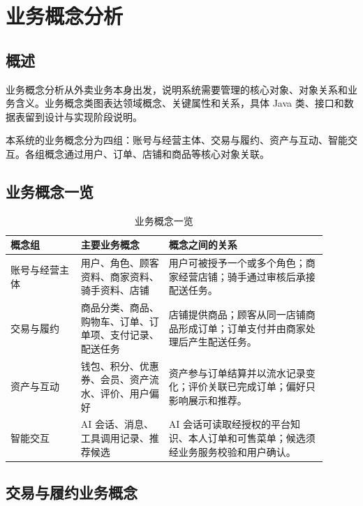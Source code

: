 \section{业务概念分析}

\subsection{概述}

业务概念分析从外卖业务本身出发，说明系统需要管理的核心对象、对象关系和业务含义。业务概念类图表达领域概念、关键属性和关系，具体 Java 类、接口和数据表留到设计与实现阶段说明。

本系统的业务概念分为四组：账号与经营主体、交易与履约、资产与互动、智能交互。各组概念通过用户、订单、店铺和商品等核心对象关联。

\subsection{业务概念一览}

\begin{longtable}{|L{0.20\linewidth}|L{0.25\linewidth}|L{0.45\linewidth}|}
\caption{业务概念一览}\label{tab:business-concepts}\\ \hline
\textbf{概念组} & \textbf{主要业务概念} & \textbf{概念之间的关系} \\ \hline
账号与经营主体 & 用户、角色、顾客资料、商家资料、骑手资料、店铺 & 用户可被授予一个或多个角色；商家经营店铺；骑手通过审核后承接配送任务。 \\ \hline
交易与履约 & 商品分类、商品、购物车、订单、订单项、支付记录、配送任务 & 店铺提供商品；顾客从同一店铺商品形成订单；订单支付并由商家处理后产生配送任务。 \\ \hline
资产与互动 & 钱包、积分、优惠券、会员、资产流水、评价、用户偏好 & 资产参与订单结算并以流水记录变化；评价关联已完成订单；偏好只影响展示和推荐。 \\ \hline
智能交互 & AI 会话、消息、工具调用记录、推荐候选 & AI 会话可读取经授权的平台知识、本人订单和可售菜单；候选须经业务服务校验和用户确认。 \\ \hline
\end{longtable}

\subsection{交易与履约业务概念}

